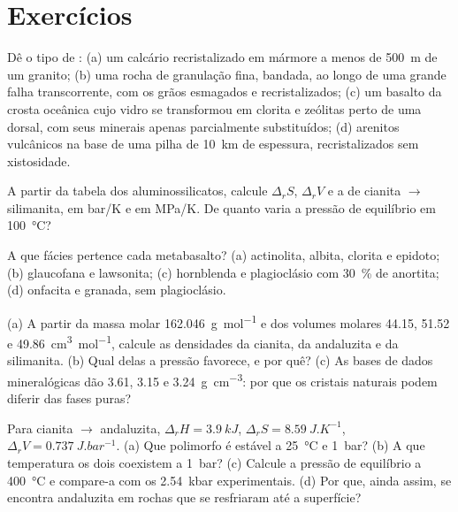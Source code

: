 \section{Exercícios}

\begin{exercise}[$\star$]\label{exo:b2:metamorphic-facies:1}
Dê o tipo de : (a) um calcário recristalizado em mármore a menos de
\qty{500}{m} de um granito; (b) uma rocha de granulação fina, bandada, ao longo de uma grande falha
transcorrente, com os grãos esmagados e recristalizados; (c) um basalto da crosta oceânica cujo
vidro se transformou em clorita e zeólitas perto de uma dorsal, com seus minerais apenas parcialmente
substituídos; (d) arenitos vulcânicos na base de uma pilha de \qty{10}{km} de espessura,
recristalizados sem xistosidade.
\end{exercise}

\begin{exercise}[$\star$]\label{exo:b2:metamorphic-facies:2}
A partir da tabela dos aluminossilicatos, calcule $\Delta_r S$, $\Delta_r V$ e a
 de cianita $\to$ silimanita, em \unit{bar/K} e em \unit{MPa/K}. De quanto
varia a pressão de equilíbrio em \qty{100}{\celsius}?
\end{exercise}

\begin{exercise}[$\star$]\label{exo:b2:metamorphic-facies:3}
A que fácies pertence cada metabasalto? (a) actinolita, albita, clorita e
epidoto; (b) glaucofana e lawsonita; (c) hornblenda e plagioclásio com
\qty{30}{\percent} de anortita; (d) onfacita e granada, sem plagioclásio.
\end{exercise}

\begin{exercise}[$\star$]\label{exo:b2:metamorphic-facies:4}
(a) A partir da massa molar \qty{162.046}{g.mol^{-1}} e dos volumes molares 44.15, 51.52 e
\qty{49.86}{cm^3.mol^{-1}}, calcule as densidades da cianita, da andaluzita e da silimanita.
(b) Qual delas a pressão favorece, e por quê? (c) As bases de dados mineralógicas dão 3.61, 3.15 e
\qty{3.24}{g.cm^{-3}}: por que os cristais naturais podem diferir das fases puras?
\end{exercise}

\begin{exercise}[$\star\star$]\label{exo:b2:metamorphic-facies:5}
Para cianita $\to$ andaluzita, $\Delta_r H = \qty{3.9}{kJ}$, $\Delta_r S =
\qty{8.59}{J.K^{-1}}$, $\Delta_r V = \qty{0.737}{J.bar^{-1}}$. (a) Que polimorfo é
estável a \qty{25}{\celsius} e \qty{1}{bar}? (b) A que temperatura os dois
coexistem a \qty{1}{bar}? (c) Calcule a pressão de equilíbrio a \qty{400}{\celsius} e
compare-a com os \qty{2.54}{kbar} experimentais. (d) Por que, ainda assim, se encontra andaluzita
em rochas que se resfriaram até a superfície?
\end{exercise}

